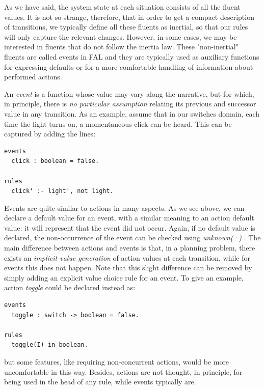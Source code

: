 \documentclass[a4paper,12pt]{report}
\begin{document}
As we have said, the system state at each situation consists of all the fluent values. It is not so strange, therefore, that in order to get a compact description of transitions, we typically define all these fluents as inertial, so that our rules will only capture the relevant changes. However, in some cases, we may be interested in fluents that do not follow the inertia law. These {\color{orange}"non-inertial"} fluents are called {\color{orange}events} in FAL and they are typically used as auxiliary functions for expressing defaults or for a more comfortable handling of information about performed actions.

An \textit{event} is a function whose value may vary along the narrative, but for which, in principle, there is \textit{no particular assumption} relating its previous and successor value in any transition. As an example, assume that in our switches domain, each time the light turns on, a momentaneous click can be heard. This can be captured by adding the lines:

\begin{verbatim}
events
  click : boolean = false.

rules
  click' :- light', not light.
\end{verbatim}


Events are quite similar to actions in many aspects. As we see above, we can declare a {\color{orange}default value} for an event, with a similar meaning to an action default value: it will represent that {\color{orange}the event did not occur}. Again, if no default value is declared, the non-occurrence of the event can be checked using \textit{unknown(·) }. The main difference between actions and events is that, in a planning problem, there exists an {\color{orange}\textit{implicit value generation}} of action values at each transition, while for events this does not happen. Note that this slight difference can be removed by simply adding an explicit value choice rule for an event. To give an example, action \textit{toggle} could be declared instead as:

\begin{verbatim}
events
  toggle : switch -> boolean = false.

rules
  toggle(I) in boolean.
\end{verbatim}

but some features, like requiring non-concurrent actions, would be more uncomfortable in this way. Besides, actions are not thought, in principle, for being used in the head of any rule, while events typically are.
\end{document}
